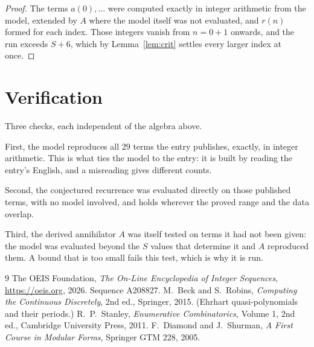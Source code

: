 \documentclass[11pt,a4paper]{article}
\theoremstyle{plain}
\theoremstyle{definition}
\begin{document}
\begin{proof}
The terms $a(0),\dots$ were computed exactly in integer arithmetic from the model, extended by
$A$ where the model itself was not evaluated, and $r(n)$ formed for each index. Those integers
vanish from $n=0+1$ onwards, and the run exceeds $S+6$, which by
Lemma~\ref{lem:crit} settles every larger index at once.
\end{proof}

\section{Verification}

Three checks, each independent of the algebra above.

First, the model reproduces all $29$ terms the entry publishes, exactly, in integer
arithmetic. This is what ties the model to the entry: it is built by reading the entry's
English, and a misreading gives different counts.

Second, the conjectured recurrence was evaluated directly on those published terms, with no
model involved, and holds wherever the proved range and the data overlap.

Third, the derived annihilator $A$ was itself tested on terms it had not been given: the model
was evaluated beyond the $S$ values that determine it and $A$ reproduced them. A bound that is
too small fails this test, which is why it is run.

\begin{thebibliography}{9}
 The OEIS Foundation, \emph{The On-Line Encyclopedia of Integer
Sequences}, \url{https://oeis.org}, 2026. Sequence A208827.
 M.~Beck and S.~Robins, \emph{Computing the Continuous Discretely},
2nd ed., Springer, 2015. (Ehrhart quasi-polynomials and their periods.)
 R.~P.~Stanley, \emph{Enumerative Combinatorics}, Volume 1, 2nd ed.,
Cambridge University Press, 2011.
 F.~Diamond and J.~Shurman, \emph{A First Course in Modular Forms},
Springer GTM 228, 2005.
\end{thebibliography}
\end{document}
